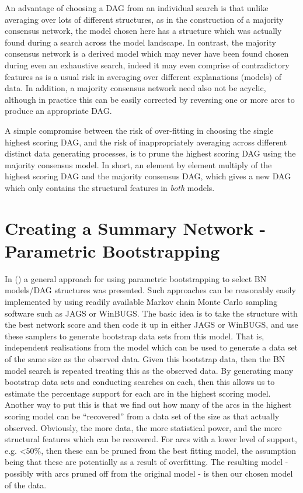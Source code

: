 \documentclass[nojss]{jss}
\begin{document}
An advantage of choosing a DAG from an individual search is that unlike averaging over lots of different structures, as in the construction of a majority consensus network, the model chosen here has a structure which was actually found during a search across the model landscape. In contrast, the majority consensus network is a derived model which may never have been found chosen during even an exhaustive search, indeed it may even comprise of contradictory features as is a usual risk in averaging over different explanations (models) of data. In addition, a majority consensus network need also not be acyclic, although in practice this can be easily corrected by reversing one or more arcs to produce an appropriate DAG.

A simple compromise between the risk of over-fitting in choosing the single highest scoring DAG, and the risk of inappropriately averaging across different distinct data generating processes, is to prune the highest scoring DAG using the majority consensus model. In short, an element by element multiply of the highest scoring DAG and the majority consensus DAG, which gives a new DAG which only contains the structural features in \emph{both} models. 

\section{Creating a Summary Network - Parametric Bootstrapping}   
In \citeauthor{Friedman1999} (\citeyear{Friedman1999}) a general approach for using parametric bootstrapping to select BN models/DAG structures was presented. Such approaches can be reasonably easily implemented by using readily available Markov chain Monte Carlo sampling software such as JAGS or WinBUGS. The basic idea is to take the structure with the best network score and then code it up in either JAGS or WinBUGS, and use these samplers to generate bootstrap data sets from this model. That is, independent realisations from the model which can be used to generate a data set of the same size as the observed data. Given this bootstrap data, then the BN model search is repeated treating this as the observed data. By generating many bootstrap data sets and conducting searches on each, then this allows us to estimate the percentage support for each arc in the highest scoring model. Another way to put this is that we find out how many of the arcs in the highest scoring model can be ``recovered'' from a data set of the size as that actually observed. Obviously, the more data, the more statistical power, and the more structural features which can be recovered. For arcs with a lower level of support, e.g. <50\%, then these can be pruned from the best fitting model, the assumption being that these are potentially as a result of overfitting. The resulting model - possibly with arcs pruned off from the original model - is then our chosen model of the data. 
\end{document}
